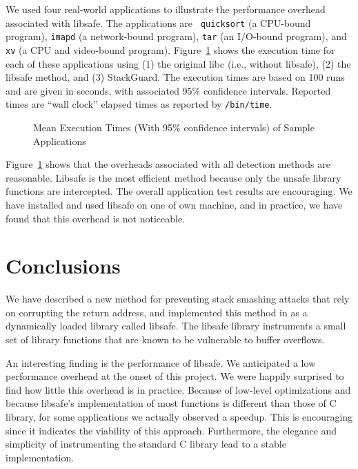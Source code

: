 \documentclass[]{article}
\begin{document}
We used four real-world applications to illustrate the performance
overhead associated with libsafe.  The applications are {\tt
quicksort} (a CPU-bound program), {\tt imapd} (a network-bound
program), {\tt tar} (an I/O-bound program), and {\tt xv} (a CPU and
video-bound program).  Figure~\ref{fig:application_performance} shows
the execution time for each of these applications using (1) the
original libc (i.e., without libsafe), (2) the libsafe method, and (3)
StackGuard.  The execution times are based on 100 runs and are given
in seconds, with associated 95\% confidence intervals.  Reported times
are ``wall clock'' elapsed times as reported by {\tt /bin/time}.

\begin{figure}[htbp]
\centerline{}
\caption{Mean Execution Times (With 95\% confidence intervals) of Sample
	Applications}
\label{fig:application_performance}
\end{figure}

Figure~\ref{fig:application_performance} shows that the overheads
associated with all detection methods are reasonable.  Libsafe is the
most efficient method because only the unsafe library functions are
intercepted.  The overall application test results are encouraging.
We have installed and used libsafe on one of own machine, and in
practice, we have found that this overhead is not noticeable.



\section{Conclusions}
\label{sec:conclusions}

We have described a new method for preventing stack smashing attacks that rely
on corrupting the return address, and implemented this method in as a
dynamically loaded library called libsafe.  The libsafe library instruments a
small set of library functions that are known to be vulnerable to buffer
overflows.

An interesting finding is the performance of libsafe.  We anticipated
a low performance overhead at the onset of this project.  We were
happily surprised to find how little this overhead is in practice.
Because of low-level optimizations and because libsafe's
implementation of most functions is different than those of C library,
for some applications we actually observed a speedup.  This is
encouraging since it indicates the viability of this approach.
Furthermore, the elegance and simplicity of instrumenting the standard
C library lead to a stable implementation.
\end{document}
